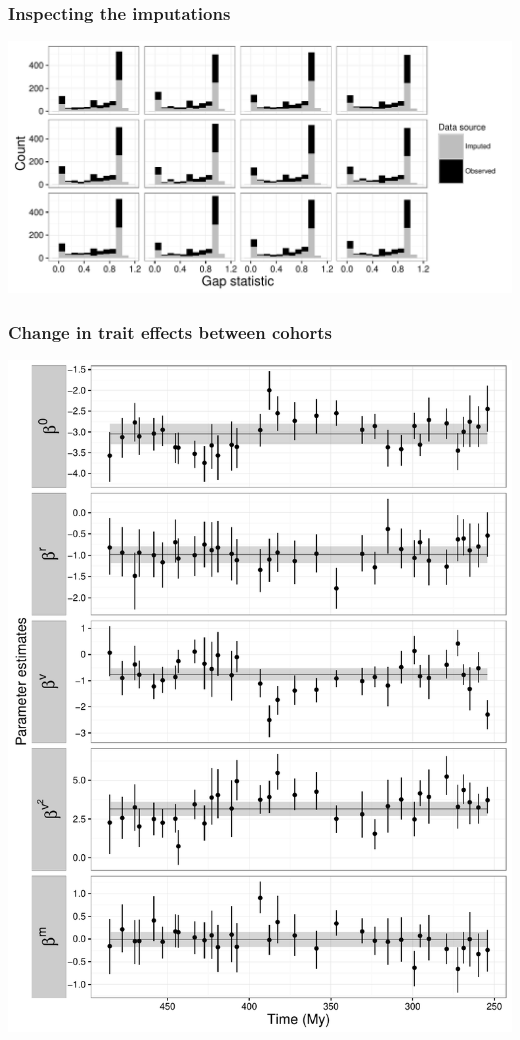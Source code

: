\documentclass{beamer}
\begin{document}
\begin{frame}
  \frametitle{Inspecting the imputations}
  \begin{center}
    \includegraphics[width=\textwidth,height=0.8\textheight,keepaspectratio=true]{figure/imputation_compare}
  \end{center}
\end{frame}


\begin{frame}
  \frametitle{Change in trait effects between cohorts}

  \begin{center}
    \includegraphics[width = \textwidth,height = 0.8\textheight,keepaspectratio = true]{figure/cohort_series}
  \end{center}
\end{frame}
\end{document}
